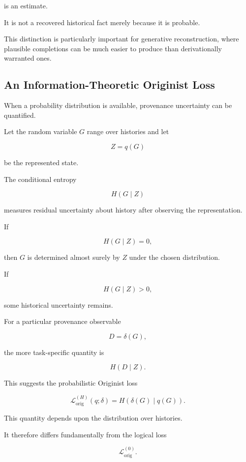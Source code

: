 \documentclass[
  11pt,
  a4paper,
  DIV=12,
  BCOR=0mm,
  parskip=half-
]{scrartcl}
\newcommand{\lossorig}{%
  \mathscr L_{\mathrm{orig}}%
}
\theoremstyle{definition}
\theoremstyle{plain}
\theoremstyle{remark}
\begin{document}
is an estimate.

It is not a recovered historical fact merely because it is probable.

This distinction is particularly important for generative reconstruction,
where plausible completions can be much easier to produce than derivationally
warranted ones.


\subsection{An Information-Theoretic Originist Loss}
\label{app:conditional-entropy}

When a probability distribution is available, provenance uncertainty can be
quantified.

Let the random variable \(G\) range over histories and let

\[
  Z=q(G)
\]

be the represented state.

The conditional entropy

\[
  H(G\mid Z)
\]

measures residual uncertainty about history after observing the
representation.

If

\[
  H(G\mid Z)=0,
\]

then \(G\) is determined almost surely by \(Z\) under the chosen distribution.

If

\[
  H(G\mid Z)>0,
\]

some historical uncertainty remains.

For a particular provenance observable

\[
  D=\delta(G),
\]

the more task-specific quantity is

\[
  H(D\mid Z).
\]

This suggests the probabilistic Originist loss

\[
  \lossorig^{(H)}(q;\delta)
  =
  H(\delta(G)\mid q(G)).
\]

This quantity depends upon the distribution over histories.

It therefore differs fundamentally from the logical loss

\[
  \lossorig^{(0)}.
\]
\end{document}
